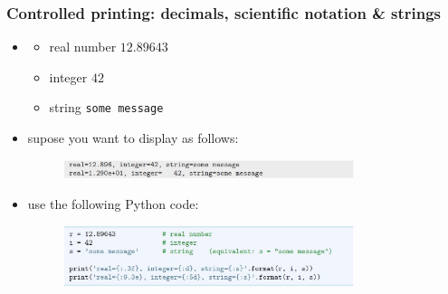 \documentclass[14pt]{beamer}
\begin{document}
\begin{frame}[fragile]

\frametitle{Controlled printing: decimals, scientific notation \& strings}

\begin{itemize}
\item[] 	\begin{itemize}
		\item real number $12.89643$
		\item integer $42$
		\item string \texttt{some message}
	\end{itemize}

\item supose you want to display as follows:
\begin{figure}[ht]
	\centering
	\includegraphics[width=0.8\textwidth]{figures/LLp29a}
\end{figure}

\item use the following Python code:
\begin{figure}[ht]
	\centering
	\includegraphics[width=0.8\textwidth]{figures/LLp29b}
\end{figure}

\end{itemize}

\end{frame}

\end{document}
